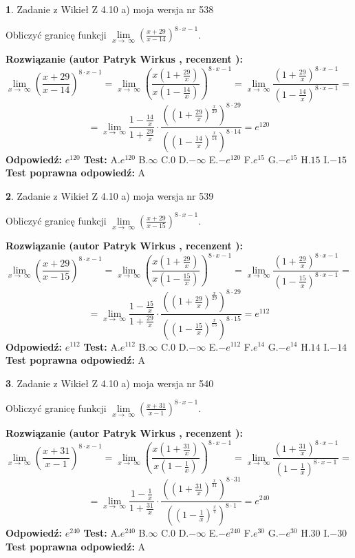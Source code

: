 \documentclass[12pt, a4paper]{article}
\theoremstyle{definition} %
\newtheorem{zad}{}
\newcommand{\zadStart}[1]{\begin{zad}#1\newline}
\newcommand{\zadStop}{\end{zad}}
\newcommand{\rozwStart}[2]{\noindent \textbf{Rozwiązanie (autor #1 , recenzent #2): }\newline}
\newcommand{\rozwStop}{\newline}
\newcommand{\odpStart}{\noindent \textbf{Odpowiedź:}\newline}
\newcommand{\odpStop}{\newline}
\newcommand{\testStart}{\noindent \textbf{Test:}\newline}
\newcommand{\testStop}{\newline}
\newcommand{\kluczStart}{\noindent \textbf{Test poprawna odpowiedź:}\newline}
\newcommand{\kluczStop}{\newline}
\begin{document}
\zadStart{Zadanie z Wikieł Z 4.10 a) moja wersja nr 538}

Obliczyć granicę funkcji  $\lim\limits_{x\to\ \infty}(\frac{x+29}{x-14})^{8\cdot x-1}$.
\zadStop
\rozwStart{Patryk Wirkus}{}
$$\lim\limits_{x\to\ \infty}(\frac{x+29}{x-14})^{8\cdot x-1} = \lim\limits_{x\to\ \infty}(\frac{x(1+\frac{29}{x})}{x(1-\frac{14}{x})})^{8\cdot x-1}=\lim\limits_{x\to\ \infty}\frac{(1+\frac{29}{x})^{8\cdot x-1}}{(1-\frac{14}{x})^{8\cdot x-1}}=$$
$$=\lim\limits_{x\to\ \infty}\frac{1-\frac{14}{x}}{1+\frac{29}{x}}\cdot\frac{((1+\frac{29}{x})^{\frac{x}{29}})^{8\cdot29}}{((1-\frac{14}{x})^{\frac{x}{14}})^{8\cdot14}}=e^{120}$$
\rozwStop
\odpStart
$e^{120}$
\odpStop
\testStart
A.$e^{120}$ B.$\infty$ C.$0$ D.$-\infty$ E.$-e^{120}$
F.$e^{15}$ G.$-e^{15}$
H.$15$
I.$-15$
\testStop
\kluczStart
A
\kluczStop



\zadStart{Zadanie z Wikieł Z 4.10 a) moja wersja nr 539}

Obliczyć granicę funkcji  $\lim\limits_{x\to\ \infty}(\frac{x+29}{x-15})^{8\cdot x-1}$.
\zadStop
\rozwStart{Patryk Wirkus}{}
$$\lim\limits_{x\to\ \infty}(\frac{x+29}{x-15})^{8\cdot x-1} = \lim\limits_{x\to\ \infty}(\frac{x(1+\frac{29}{x})}{x(1-\frac{15}{x})})^{8\cdot x-1}=\lim\limits_{x\to\ \infty}\frac{(1+\frac{29}{x})^{8\cdot x-1}}{(1-\frac{15}{x})^{8\cdot x-1}}=$$
$$=\lim\limits_{x\to\ \infty}\frac{1-\frac{15}{x}}{1+\frac{29}{x}}\cdot\frac{((1+\frac{29}{x})^{\frac{x}{29}})^{8\cdot29}}{((1-\frac{15}{x})^{\frac{x}{15}})^{8\cdot15}}=e^{112}$$
\rozwStop
\odpStart
$e^{112}$
\odpStop
\testStart
A.$e^{112}$ B.$\infty$ C.$0$ D.$-\infty$ E.$-e^{112}$
F.$e^{14}$ G.$-e^{14}$
H.$14$
I.$-14$
\testStop
\kluczStart
A
\kluczStop



\zadStart{Zadanie z Wikieł Z 4.10 a) moja wersja nr 540}

Obliczyć granicę funkcji  $\lim\limits_{x\to\ \infty}(\frac{x+31}{x-1})^{8\cdot x-1}$.
\zadStop
\rozwStart{Patryk Wirkus}{}
$$\lim\limits_{x\to\ \infty}(\frac{x+31}{x-1})^{8\cdot x-1} = \lim\limits_{x\to\ \infty}(\frac{x(1+\frac{31}{x})}{x(1-\frac{1}{x})})^{8\cdot x-1}=\lim\limits_{x\to\ \infty}\frac{(1+\frac{31}{x})^{8\cdot x-1}}{(1-\frac{1}{x})^{8\cdot x-1}}=$$
$$=\lim\limits_{x\to\ \infty}\frac{1-\frac{1}{x}}{1+\frac{31}{x}}\cdot\frac{((1+\frac{31}{x})^{\frac{x}{31}})^{8\cdot31}}{((1-\frac{1}{x})^{\frac{x}{1}})^{8\cdot1}}=e^{240}$$
\rozwStop
\odpStart
$e^{240}$
\odpStop
\testStart
A.$e^{240}$ B.$\infty$ C.$0$ D.$-\infty$ E.$-e^{240}$
F.$e^{30}$ G.$-e^{30}$
H.$30$
I.$-30$
\testStop
\kluczStart
A
\kluczStop
\end{document}
